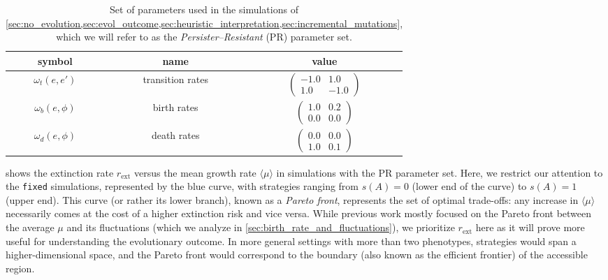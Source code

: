 \documentclass[aps,pre,reprint,10pt,superscriptaddress]{revtex4-2}
\begin{document}
\begin{table}
    \begin{tabular}{c c c}
        \toprule
        symbol             & name             & value                                            \\
        \midrule
        $\omega_t(e,e')$   & transition rates & $\begin{pmatrix}-1.0&1.0\\1.0&-1.0\end{pmatrix}$ \\
        \addlinespace
        $\omega_b(e,\phi)$ & birth rates      & $\begin{pmatrix}1.0&0.2\\0.0&0.0\end{pmatrix}$   \\
        \addlinespace
        $\omega_d(e,\phi)$ & death rates      & $\begin{pmatrix}0.0&0.0\\1.0&0.1\end{pmatrix}$   \\
        \bottomrule
    \end{tabular}
    \caption{Set of parameters used in the simulations of \cref{sec:no_evolution,sec:evol_outcome,sec:heuristic_interpretation,sec:incremental_mutations}, which we will refer to as the \emph{Persister--Resistant} (PR) parameter set.} \label{tab:PR_parameters}
\end{table}

 shows the extinction rate $r_\text{ext}$ versus the mean growth rate $\langle\mu\rangle$ in simulations with the PR parameter set. Here, we restrict our attention to the \texttt{fixed} simulations, represented by the blue curve, with strategies ranging from $s(A)=0$ (lower end of the curve) to $s(A)=1$ (upper end). This curve (or rather its lower branch), known as a \emph{Pareto front}, represents the set of optimal trade-offs: any increase in $\langle\mu\rangle$ necessarily comes at the cost of a higher extinction risk and vice versa. While previous work mostly focused on the Pareto front between the average $\mu$ and its fluctuations \cite{dinisPhaseTransitionsOptimal2020,dinisParetooptimalTradeoffPhenotypic2022} (which we analyze in \cref{sec:birth_rate_and_fluctuations}), we prioritize $r_\text{ext}$ here as it will prove more useful for understanding the evolutionary outcome. In more general settings with more than two phenotypes, strategies would span a higher-dimensional space, and the Pareto front would correspond to the boundary (also known as the efficient frontier) of the accessible region.
\end{document}
